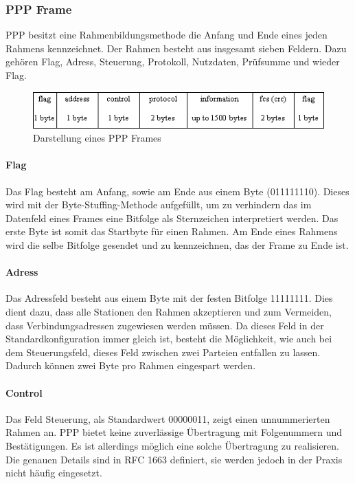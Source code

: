 \documentclass[12pt, a4paper, ngerman]{article}
\begin{document}
\subsubsection{PPP Frame}

PPP besitzt eine Rahmenbildungsmethode die Anfang und Ende eines jeden Rahmens kennzeichnet. 
Der Rahmen besteht aus insgesamt sieben Feldern. Dazu gehören Flag, Adress, Steuerung,  Protokoll, Nutzdaten, Prüfsumme und wieder Flag.

\begin{figure}[H]
	\centering
	\includegraphics[width=1\textwidth]{Grafiken/lcp-header-alone.jpg}	
	\caption{Darstellung eines PPP Frames}
	\label{ppp_frame}
\end{figure}

\paragraph{Flag}

Das Flag besteht am Anfang, sowie am Ende  aus einem Byte (011111110). 
Dieses wird mit der Byte-Stuffing-Methode aufgefüllt, um zu verhindern das im Datenfeld eines Frames eine Bitfolge als Sternzeichen interpretiert werden. Das erste Byte ist somit das Startbyte für einen Rahmen. Am Ende eines Rahmens wird die selbe Bitfolge gesendet und zu kennzeichnen, das der Frame zu Ende ist.


\paragraph{Adress}

Das Adressfeld besteht aus einem Byte mit der festen Bitfolge 11111111. Dies dient dazu, dass alle Stationen den Rahmen akzeptieren und zum Vermeiden, dass Verbindungsadressen zugewiesen werden müssen. Da dieses Feld in der Standardkonfiguration immer gleich ist, besteht die Möglichkeit, wie auch bei dem Steuerungsfeld, dieses Feld zwischen zwei Parteien entfallen zu lassen. Dadurch können zwei Byte pro Rahmen eingespart werden.


\paragraph{Control}

Das Feld Steuerung, als Standardwert 00000011, zeigt einen unnummerierten Rahmen an. PPP bietet keine zuverlässige Übertragung mit Folgenummern und Bestätigungen. Es ist allerdings möglich eine solche 
Über\-tra\-gung zu realisieren. Die genauen Details sind in RFC 1663 definiert, sie werden jedoch in der Praxis nicht häufig eingesetzt.
\end{document}
